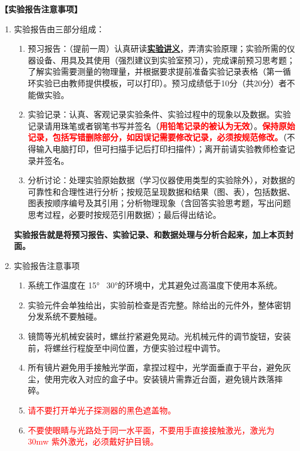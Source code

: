 \documentclass[dvipsnames, svgnames,a4paper,11pt]{article}
\begin{document}
\textbf{【实验报告注意事项】}
\begin{enumerate}
	\item 实验报告由三部分组成：
	\begin{enumerate}
		\item 预习报告：（提前一周）认真研读\underline{\textbf{实验讲义}}，弄清实验原理；实验所需的仪器设备、用具及其使用（强烈建议到实验室预习），完成课前预习思考题；了解实验需要测量的物理量，并根据要求提前准备实验记录表格（第一循环实验已由教师提供模板，可以打印）。预习成绩低于10分（共20分）者不能做实验。
	    \item 实验记录：认真、客观记录实验条件、实验过程中的现象以及数据。实验记录请用珠笔或者钢笔书写并签名（\textcolor{red}{\textbf{用铅笔记录的被认为无效}}）。\textcolor{red}{\textbf{保持原始记录，包括写错删除部分，如因误记需要修改记录，必须按规范修改。}}（不得输入电脑打印，但可扫描手记后打印扫描件）；离开前请实验教师检查记录并签名。
	    \item 分析讨论：处理实验原始数据（学习仪器使用类型的实验除外），对数据的可靠性和合理性进行分析；按规范呈现数据和结果（图、表），包括数据、图表按顺序编号及其引用；分析物理现象（含回答实验思考题，写出问题思考过程，必要时按规范引用数据）；最后得出结论。
	\end{enumerate}
	\textbf{实验报告就是将预习报告、实验记录、和数据处理与分析合起来，加上本页封面。}
	\item 实验报告注意事项
		\begin{enumerate}[label=\roman*.]
			\item 系统工作温度在 15°~ 30°的环境中，尤其避免过高温度下使用本系统。
			\item 实验元件会单独给出，实验前检查是否完整。除给出的元件外，整体密钥分发系统不要触碰。
			\item 镜筒等光机械安装时，螺丝拧紧避免晃动。光机械元件的调节旋钮，安装前，将螺丝行程旋至中间位置，方便实验过程中调节。
			\item 所有镜片避免用手接触光学面，拿捏过程中，光学面垂直于平台，避免灰尘，使用完收入对应的盒子中。安装镜片需靠近台面，避免镜片跌落摔碎。
			\item \textcolor{red}{请不要打开单光子探测器的黑色遮盖物。}
			\item \textcolor{red}{不要使眼睛与光路处于同一水平面，不要用手直接接触激光，激光为 30mw 紫外激光，必须戴好护目镜。}
		\end{enumerate}
\end{enumerate}
\end{document}
